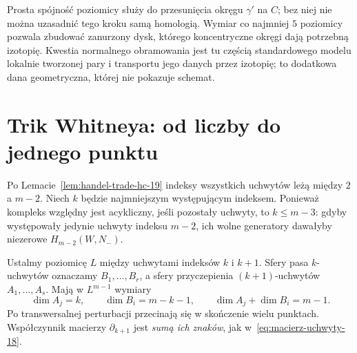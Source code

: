 \begin{uwaga}
\label{uwaga:wymiana-warunki-19}
Prosta spójność poziomicy służy
do przesunięcia okręgu
$\gamma'$ na $C$; bez niej
nie można uzasadnić tego kroku
samą homologią. Wymiar
co najmniej $5$ poziomicy
pozwala zbudować zanurzony dysk, którego koncentryczne okręgi
dają potrzebną izotopię. Kwestia normalnego obramowania
jest tu częścią standardowego modelu lokalnie tworzonej pary
i transportu jego danych przez izotopię;
to dodatkowa dana geometryczna,
której nie pokazuje schemat.
\end{uwaga}

\section{Trik Whitneya: od liczby do jednego punktu}
\label{sec:whitney-hc-19}

Po Lemacie~\ref{lem:handel-trade-hc-19}
indeksy wszystkich uchwytów leżą
między $2$ a $m-2$.
Niech $k$ będzie najmniejszym
występującym indeksem.
Ponieważ kompleks względny jest
acykliczny, jeśli pozostały uchwyty,
to $k\leq m-3$: gdyby występowały
jedynie uchwyty indeksu $m-2$,
ich wolne generatory dawałyby
niezerowe $H_{m-2}(W,N_-)$.

Ustalmy poziomicę $L$ między
uchwytami indeksów $k$ i $k+1$.
Sfery pasa $k$-uchwytów
oznaczamy $B_1,\ldots,B_r$,
a sfery przyczepienia
$(k+1)$-uchwytów
$A_1,\ldots,A_s$.
Mają w $L^{m-1}$ wymiary
\[
 \dim A_j=k,\qquad
 \dim B_i=m-k-1,\qquad
 \dim A_j+\dim B_i=m-1.
\]
Po transwersalnej perturbacji
przecinają się w skończenie
wielu punktach. Współczynnik
macierzy $\partial_{k+1}$
jest \emph{sumą ich znaków},
jak w~\eqref{eq:macierz-uchwyty-18}.

